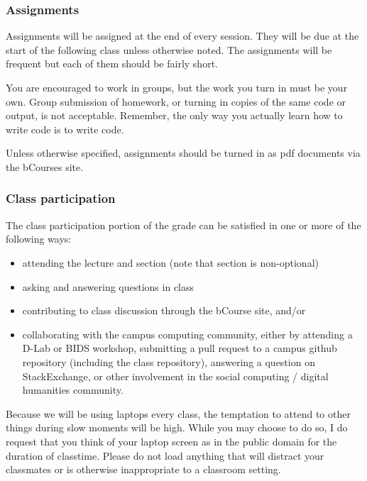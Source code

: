 \documentclass[
]{book}
\providecommand{\tightlist}{%
  \setlength{\itemsep}{0pt}\setlength{\parskip}{0pt}}
\begin{document}
\hypertarget{assignments}{%
\subsubsection{Assignments}\label{assignments}}

Assignments will be assigned at the end of every session. They will be due at the start of the following class unless otherwise noted. The assignments will be frequent but each of them should be fairly short.

You are encouraged to work in groups, but the work you turn in must be your own. Group submission of homework, or turning in copies of the same code or output, is not acceptable. Remember, the only way you actually learn how to write code is to write code.

Unless otherwise specified, assignments should be turned in as pdf documents via the bCourses site.

\hypertarget{class-participation}{%
\subsubsection{Class participation}\label{class-participation}}

The class participation portion of the grade can be satisfied in one or more of the following ways:

\begin{itemize}
\tightlist
\item
  attending the lecture and section (note that section is non-optional)
\item
  asking and answering questions in class
\item
  contributing to class discussion through the bCourse site, and/or
\item
  collaborating with the campus computing community, either by attending a D-Lab or BIDS workshop, submitting a pull request to a campus github repository (including the class repository), answering a question on StackExchange, or other involvement in the social computing / digital humanities community.
\end{itemize}

Because we will be using laptops every class, the temptation to attend to other things during slow moments will be high. While you may choose to do so, I do request that you think of your laptop screen as in the public domain for the duration of classtime. Please do not load anything that will distract your classmates or is otherwise inappropriate to a classroom setting.
\end{document}
